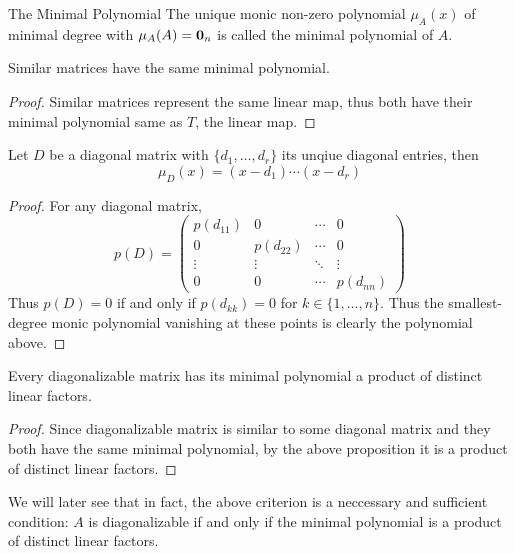 \documentclass[a4paper]{article}
\begin{document}
\begin{defn}{The Minimal Polynomial}{} The unique monic non-zero polynomial $\mu_A(x)$ of minimal degree with $\mu_A(A)=\vb{0}_n$ is called the minimal polynomial of $A$. 
\end{defn}

\begin{prp}{}{} Similar matrices have the same minimal polynomial. \tcbline\begin{proof} Similar matrices represent the same linear map, thus both have their minimal polynomial same as $T$, the linear map. 
\end{proof}
\end{prp}

\begin{prp}{}{} Let $D$ be a diagonal matrix with $\{d_1,\dots,d_r\}$ its unqiue diagonal entries, then $$\mu_D(x)=(x-d_1)\cdots(x-d_r)$$\tcbline
\begin{proof} For any diagonal matrix, $$p(D)=\begin{pmatrix}p(d_{11}) & 0 & \cdots & 0\\ 0 & p(d_{22}) & \cdots & 0 \\ \vdots & \vdots & \ddots & \vdots\\ 0 & 0 & \cdots & p(d_{nn})\end{pmatrix}$$ Thus $p(D)=0$ if and only if $p(d_{kk})=0$ for $k\in\{1,\dots,n\}$. Thus the smallest-degree monic polynomial vanishing at these points is clearly the polynomial above. 
\end{proof}
\end{prp}

\begin{crl}{}{} Every diagonalizable matrix has its minimal polynomial a product of distinct linear factors. \tcbline
\begin{proof} Since diagonalizable matrix is similar to some diagonal matrix and they both have the same minimal polynomial, by the above proposition it is a product of distinct linear factors. 
\end{proof}
\end{crl}

We will later see that in fact, the above criterion is a neccessary and sufficient condition: $A$ is diagonalizable if and only if the minimal polynomial is a product of distinct linear factors. 
\end{document}
